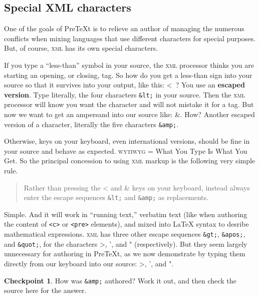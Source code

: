 \documentclass{amsart}
\theoremstyle{plain}%
\theoremstyle{definition}%
\newtheorem{inlineexercise}[theorem]{Checkpoint}
\theoremstyle{remark}%
\newcommand{\mono}[1]{\texttt{#1}}
\newcommand{\initialism}[1]{\textsc{\MakeLowercase{#1}}}
\DeclareRobustCommand{\initialismintitle}[1]{\texorpdfstring{#1}{#1}}
\newcommand{\terminology}[1]{\textbf{#1}}
\numberwithin{equation}{section}
\begin{document}
\subsection{Special \initialismintitle{XML} characters}\label{subsection-xml-escape}%
One of the goals of PreTeXt is to relieve an author of managing the numerous conflicts when mixing languages that use different characters for special purposes.  But, of course, \initialism{XML} has its own special characters.%
\par
If you type a ``less-than'' symbol in your source, the \initialism{XML} processor thinks you are starting an opening, or closing, tag.  So how do you get a less-than sign into your source so that it survives into your output, like this: \textless{}~?  You use an \terminology{escaped version}.  Type literally, the four characters \mono{\&lt;} in your source.  Then the \initialism{XML} processor will know you want the character and will not mistake it for a tag.  But now we want to get an ampersand into our source like: \&.  How?  Another escaped version of a character, literally the five characters \mono{\&amp;}.%
\par
Otherwise, keys on your keyboard, even international versions, should be fine in your source and behave as expected.  \initialism{WYTIWYG} = What You Type Is What You Get.  So the principal concession to using \initialism{XML} markup is the following very simple rule.%
\begin{quote}%
Rather than pressing the \textless{} and \& keys on your keyboard, instead always enter the escape sequences \mono{\&lt;} and \mono{\&amp;} as replacements.%
\end{quote}
Simple.  And it will work in ``running text,'' verbatim text (like when authoring the content of \mono{<c>} or \mono{<pre>} elements), and mixed into \LaTeX{} syntax to desribe mathematical expressions.  \initialism{XML} has three other escape sequences \mono{\&gt;}, \mono{\&apos;}, and \mono{\&quot;}, for the characters \textgreater{}, ', and " (respectively).  But they seem largely unnecessary for authoring in PreTeXt, as we now demonstrate by typing them directly from our keyboard into our source: \textgreater{}, ', and ".%
\begin{inlineexercise}\label{subsection-xml-escape-7}%
%
How was \mono{\&amp;} authored?  Work it out, and then check the source here for the answer.%
\end{inlineexercise}%
%
%
\typeout{************************************************}
\typeout{************************************************}
%
\end{document}
